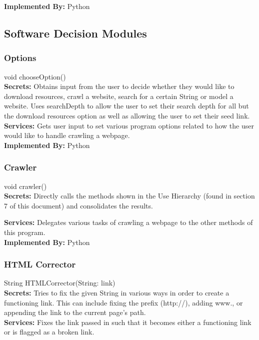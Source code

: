 \documentclass[titlepage]{article}
\begin{document}
\textbf{Implemented By:}
Python

\subsection{Software Decision Modules}
\subsubsection{Options}
void chooseOption()\\

\textbf{Secrets:}
Obtains input from the user to decide whether they would like to download resources, crawl a website, search for a certain String or model a website. Uses searchDepth to allow the user to set their search depth for all but the download resources option as well as allowing the user to set their seed link.\\

\textbf{Services:}
Gets user input to set various program options related to how the user would like to handle crawling a webpage.\\

\textbf{Implemented By:}
Python

\subsubsection{Crawler}
void crawler()\\

\textbf{Secrets:}
Directly calls the methods shown in the Use Hierarchy (found in section 7 of this document) and consolidates the results.

\textbf{Services:}
Delegates various tasks of crawling a webpage to the other methods of this program.\\

\textbf{Implemented By:}
Python

\subsubsection{HTML Corrector}
String HTMLCorrector(String: link)\\

\textbf{Secrets:}
Tries to fix the given String in various ways in order to create a functioning link. This can include fixing the prefix (http://), adding www., or appending the link to the current page's path.\\

\textbf{Services:}
Fixes the link passed in such that it becomes either a functioning link or is flagged as a broken link.\\
\end{document}
